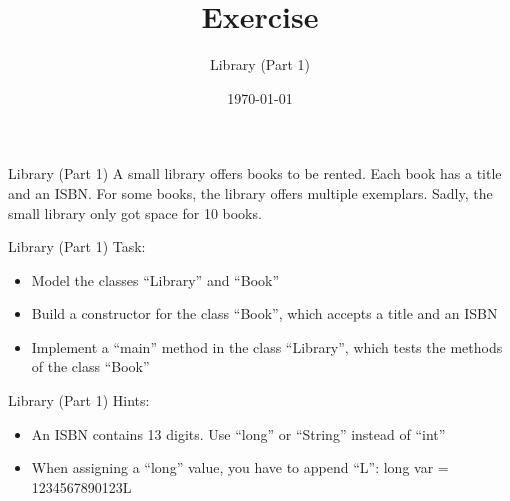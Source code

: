


\title{Exercise}
\subtitle{Library (Part 1)}
\date{\today}




\begin{frame}
    \titlepage
\end{frame}

\begin{frame}{Library (Part 1)}
    A small library offers books to be rented. Each book has a title and an ISBN. For some books, the library offers multiple exemplars. Sadly, the small library only got space for 10 books.
\end{frame}

\begin{frame}{Library (Part 1)}
    Task:
    \begin{itemize}
        \item Model the classes ``Library'' and ``Book''
        \item Build a constructor for the class ``Book'', which accepts a title and an ISBN
        \item Implement a ``main'' method in the class ``Library'', which tests the methods of the class ``Book''
    \end{itemize}
\end{frame}

\begin{frame}{Library (Part 1)}
    Hints:
    \begin{itemize}
        \item An ISBN contains 13 digits. Use ``long'' or ``String'' instead of ``int''
        \item When assigning a ``long'' value, you have to append ``L'': long var = 1234567890123L
    \end{itemize}
\end{frame}



